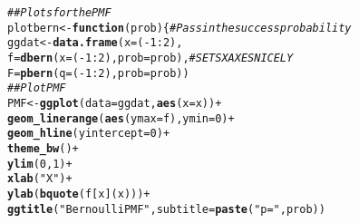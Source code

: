 \documentclass{article}\usepackage[]{graphicx}\usepackage[]{color}
\makeatletter
\newcommand{\hlnum}[1]{\textcolor[rgb]{0.686,0.059,0.569}{#1}}%
\newcommand{\hlstr}[1]{\textcolor[rgb]{0.192,0.494,0.8}{#1}}%
\newcommand{\hlcom}[1]{\textcolor[rgb]{0.678,0.584,0.686}{\textit{#1}}}%
\newcommand{\hlopt}[1]{\textcolor[rgb]{0,0,0}{#1}}%
\newcommand{\hlstd}[1]{\textcolor[rgb]{0.345,0.345,0.345}{#1}}%
\newcommand{\hlkwa}[1]{\textcolor[rgb]{0.161,0.373,0.58}{\textbf{#1}}}%
\newcommand{\hlkwb}[1]{\textcolor[rgb]{0.69,0.353,0.396}{#1}}%
\newcommand{\hlkwc}[1]{\textcolor[rgb]{0.333,0.667,0.333}{#1}}%
\newcommand{\hlkwd}[1]{\textcolor[rgb]{0.737,0.353,0.396}{\textbf{#1}}}%
\newenvironment{kframe}{%
 \def\at@end@of@kframe{}%
 \ifinner\ifhmode%
  \def\at@end@of@kframe{\end{minipage}}%
  \begin{minipage}{\columnwidth}%
 \fi\fi%
 \def\FrameCommand##1{\hskip\@totalleftmargin \hskip-\fboxsep
 \colorbox{shadecolor}{##1}\hskip-\fboxsep
     \hskip-\linewidth \hskip-\@totalleftmargin \hskip\columnwidth}%
 \MakeFramed {\advance\hsize-\width
   \@totalleftmargin\z@ \linewidth\hsize
   \@setminipage}}%
 {\par\unskip\endMakeFramed%
 \at@end@of@kframe}
\newenvironment{knitrout}{}{} %
\makeatother
\begin{document}
\begin{enumerate}
\begin{knitrout}
\begin{kframe}
\begin{alltt}
\hlcom{## Plots for the PMF}
\hlstd{plotbern} \hlkwb{<-} \hlkwa{function}\hlstd{(}\hlkwc{prob}\hlstd{)\{} \hlcom{# Pass in the success probability}
  \hlstd{ggdat} \hlkwb{<-} \hlkwd{data.frame}\hlstd{(}\hlkwc{x} \hlstd{= (}\hlopt{-}\hlnum{1}\hlopt{:}\hlnum{2}\hlstd{),}
                      \hlkwc{f} \hlstd{=} \hlkwd{dbern}\hlstd{(}\hlkwc{x} \hlstd{= (}\hlopt{-}\hlnum{1}\hlopt{:}\hlnum{2}\hlstd{),} \hlkwc{prob} \hlstd{= prob),} \hlcom{#SETS X AXES NICELY}
                      \hlkwc{F} \hlstd{=} \hlkwd{pbern}\hlstd{(}\hlkwc{q} \hlstd{= (}\hlopt{-}\hlnum{1}\hlopt{:}\hlnum{2}\hlstd{),} \hlkwc{prob} \hlstd{= prob))}
  \hlcom{## Plot PMF}
  \hlstd{PMF} \hlkwb{<-} \hlkwd{ggplot}\hlstd{(}\hlkwc{data} \hlstd{= ggdat,} \hlkwd{aes}\hlstd{(}\hlkwc{x} \hlstd{= x))} \hlopt{+}
    \hlkwd{geom_linerange}\hlstd{(}\hlkwd{aes}\hlstd{(}\hlkwc{ymax} \hlstd{= f),} \hlkwc{ymin} \hlstd{=} \hlnum{0}\hlstd{)} \hlopt{+}
    \hlkwd{geom_hline}\hlstd{(}\hlkwc{yintercept} \hlstd{=} \hlnum{0}\hlstd{)} \hlopt{+}
    \hlkwd{theme_bw}\hlstd{()} \hlopt{+}
    \hlkwd{ylim}\hlstd{(}\hlnum{0}\hlstd{,} \hlnum{1}\hlstd{)} \hlopt{+}
    \hlkwd{xlab}\hlstd{(}\hlstr{"X"}\hlstd{)} \hlopt{+}
    \hlkwd{ylab}\hlstd{(}\hlkwd{bquote}\hlstd{(f[x](x)))} \hlopt{+}
    \hlkwd{ggtitle}\hlstd{(}\hlstr{"Bernoulli PMF"}\hlstd{,} \hlkwc{subtitle} \hlstd{=} \hlkwd{paste}\hlstd{(}\hlstr{"p ="}\hlstd{, prob))}


\end{alltt}
\end{kframe}
\end{knitrout}
\end{enumerate}
\end{document}
